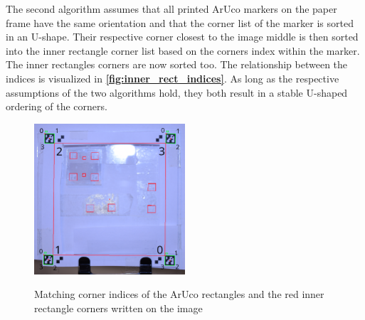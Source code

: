 \documentclass[10pt]{book}
\newenvironment{code}{\captionsetup{type=listing}}{}
\newcommand{\figureref}[1]{\textbf{\autoref{#1}}}
\begin{document}
The second algorithm assumes that all printed \ac{ArUco} markers on the paper frame have the same orientation and that the corner list of the marker is sorted in an U-shape. Their respective corner closest to the image middle is then sorted into the inner rectangle corner list based on the corners index within the marker. %
The inner rectangles corners are now sorted too. The relationship between the indices is visualized in \figureref{fig:inner_rect_indices}. As long as the respective assumptions of the two algorithms hold, they both result in a stable U-shaped ordering of the corners.

\begin{figure}
  \caption{Matching corner indices of the \ac{ArUco} rectangles and the red inner rectangle corners written on the image}
  \includegraphics[width=0.5\textwidth]{image/af_markings_3}
  \label{fig:inner_rect_indices}
\end{figure}


                
        
\end{document}
